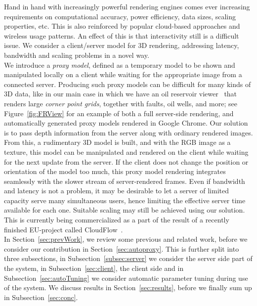 \documentclass[10pt,conference,compsocconf]{IEEEtran}
\begin{document}
Hand in hand with increasingly powerful rendering engines comes ever increasing
requirements on computational accuracy, power efficiency, data sizes, scaling
properties, etc. This is also reinforced by popular cloud-based approaches and
wireless usage patterns. An effect of this is that interactivity still is a
difficult issue. We consider a client/server model for 3D rendering, addressing
latency, bandwidth and scaling problems in a novel way.
\\
We introduce a {\em proxy model}, defined as a temporary model to be shown and
manipulated locally on a client while waiting for the appropriate image from a
connected server. Producing such proxy models can be difficult for many kinds of
3D data, like in our main case in which we have an oil reservoir
viewer~\cite{cloudviz} that renders large {\em corner point grids}, together
with faults, oil wells, and more; see Figure~\ref{fig:FRView} for an
example of both a full server-side rendering, and automatically generated proxy
models rendered in Google Chrome.
%
Our solution is to pass depth information from the server along with ordinary
rendered images. From this, a rudimentary 3D model is built, and with the RGB
image as a texture, this model can be manipulated and rendered on the client
while waiting for the next update from the server. If the client does not change
the position or orientation of the model too much, this proxy model rendering
integrates seamlessly with the slower stream of server-rendered frames.
%
Even if bandwidth and latency is not a problem, it may be desirable to let a
server of limited capacity serve many simultaneous users, hence limiting the
effective server time available for each one. Suitable scaling may still be
achieved using our solution. This is currently being commercialized as a part of
the result of  a recently finished EU-project called CloudFlow~\cite{cloudflow}.
\\
In Section~\ref{sec:prevWork}, we review some previous and related work, before
we consider our contribution in Section~\ref{sec:autoproxy}. This is further
split into three subsections, in Subsection~\ref{subsec:server} we consider the
server side part of the system, in Subsection~\ref{sec:client}, the client side
and in Subsection~\ref{sec:autoTuning} we consider automatic parameter tuning
during use of the system. We discuss results in Section~\ref{sec:results},
before we finally sum up in Subsection~\ref{sec:conc}.
\end{document}
